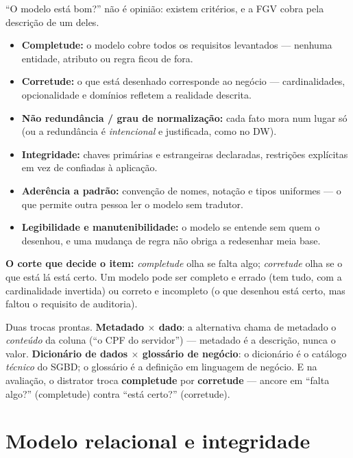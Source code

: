\begin{conceito}
``O modelo está bom?'' não é opinião: existem critérios, e a FGV cobra pela
descrição de um deles.

\begin{itemize}
\item \textbf{Completude:} o modelo cobre todos os requisitos levantados ---
nenhuma entidade, atributo ou regra ficou de fora.
\item \textbf{Corretude:} o que está desenhado corresponde ao negócio ---
cardinalidades, opcionalidade e domínios refletem a realidade descrita.
\item \textbf{Não redundância / grau de normalização:} cada fato mora num
lugar só (ou a redundância é \emph{intencional} e justificada, como no DW).
\item \textbf{Integridade:} chaves primárias e estrangeiras declaradas,
restrições explícitas em vez de confiadas à aplicação.
\item \textbf{Aderência a padrão:} convenção de nomes, notação e tipos
uniformes --- o que permite outra pessoa ler o modelo sem tradutor.
\item \textbf{Legibilidade e manutenibilidade:} o modelo se entende sem quem o
desenhou, e uma mudança de regra não obriga a redesenhar meia base.
\end{itemize}

\textbf{O corte que decide o item:} \emph{completude} olha se falta algo;
\emph{corretude} olha se o que está lá está certo. Um modelo pode ser completo
e errado (tem tudo, com a cardinalidade invertida) ou correto e incompleto
(o que desenhou está certo, mas faltou o requisito de auditoria).
\end{conceito}

\begin{pegadinha}
Duas trocas prontas. \textbf{Metadado $\times$ dado}: a alternativa chama de
metadado o \emph{conteúdo} da coluna (``o CPF do servidor'') --- metadado é a
descrição, nunca o valor. \textbf{Dicionário de dados $\times$ glossário de
negócio}: o dicionário é o catálogo \emph{técnico} do SGBD; o glossário é a
definição em linguagem de negócio. E na avaliação, o distrator troca
\textbf{completude} por \textbf{corretude} --- ancore em ``falta algo?''
(completude) contra ``está certo?'' (corretude).
\end{pegadinha}

\section{Modelo relacional e integridade}

